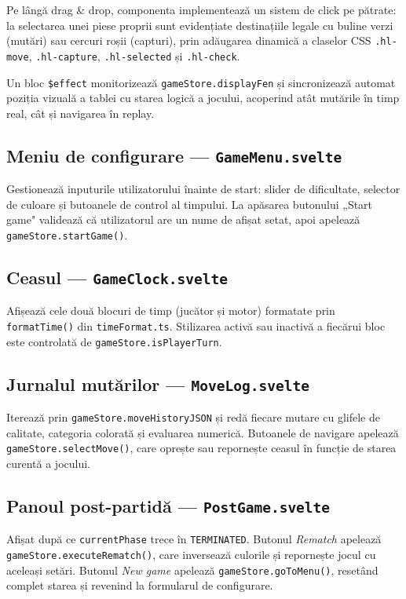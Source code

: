 \documentclass[12pt,a4paper]{article}
\begin{document}
Pe lângă drag \& drop, componenta implementează un sistem de click pe pătrate: la selectarea unei piese proprii sunt evidențiate destinațiile legale cu buline verzi (mutări) sau cercuri roșii (capturi), prin adăugarea dinamică a claselor CSS \texttt{.hl-move}, \texttt{.hl-capture}, \texttt{.hl-selected} și \texttt{.hl-check}.

Un bloc \texttt{\$effect} monitorizează \texttt{gameStore.displayFen} și sincronizează automat poziția vizuală a tablei cu starea logică a jocului, acoperind atât mutările în timp real, cât și navigarea în replay.

\subsection{Meniu de configurare — \texttt{GameMenu.svelte}}

Gestionează inputurile utilizatorului înainte de start: slider de dificultate, selector de culoare și butoanele de control al timpului. La apăsarea butonului „Start game" validează că utilizatorul are un nume de afișat setat, apoi apelează \texttt{gameStore.startGame()}.

\subsection{Ceasul — \texttt{GameClock.svelte}}

Afișează cele două blocuri de timp (jucător și motor) formatate prin \texttt{formatTime()} din \texttt{timeFormat.ts}. Stilizarea activă sau inactivă a fiecărui bloc este controlată de \texttt{gameStore.isPlayerTurn}.

\subsection{Jurnalul mutărilor — \texttt{MoveLog.svelte}}

Iterează prin \texttt{gameStore.moveHistoryJSON} și redă fiecare mutare cu glifele de calitate, categoria colorată și evaluarea numerică. Butoanele de navigare apelează \texttt{gameStore.selectMove()}, care oprește sau repornește ceasul în funcție de starea curentă a jocului.

\subsection{Panoul post-partidă — \texttt{PostGame.svelte}}

Afișat după ce \texttt{currentPhase} trece în \texttt{TERMINATED}. Butonul \textit{Rematch} apelează \texttt{gameStore.executeRematch()}, care inversează culorile și repornește jocul cu aceleași setări. Butonul \textit{New game} apelează \texttt{gameStore.goToMenu()}, resetând complet starea și revenind la formularul de configurare.
\end{document}
